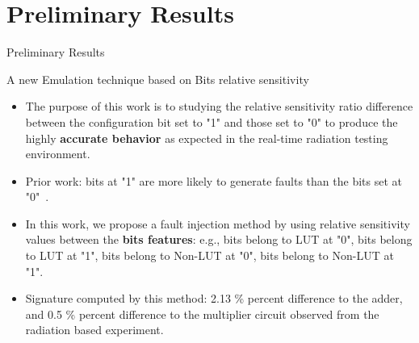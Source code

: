\documentclass[aspectratio=1610]{beamer}
\newcommand{\semitransp}[2][35]{\color{fg!#1}#2}
\begin{document}
\section{Preliminary Results}
\vspace{-2cm}
\begin{frame} {Preliminary Results}

\begin{block}{A new Emulation technique based on Bits relative sensitivity}
\end{block}

\begin{itemize}
\item  The purpose of this work is to studying the relative sensitivity ratio difference between the configuration bit set to "1" and those set to "0" to produce the highly \textbf{accurate behavior} as expected in the real-time radiation testing environment.

\item Prior work: bits at "1" are more likely to generate faults than the bits set at "0"~\citep{souari2016towards}.

\item{In this work, we propose a fault injection method by using relative sensitivity values between the \textbf{bits features}: e.g., bits belong to LUT at "0", bits belong to LUT at "1", bits belong to Non-LUT at "0", bits belong to Non-LUT at "1"}.


\item Signature computed by this method: 2.13 \% percent difference to the adder, and 0.5 \% percent difference to the multiplier circuit observed from the radiation based experiment.




\end{itemize}
\end{frame}
\end{document}
